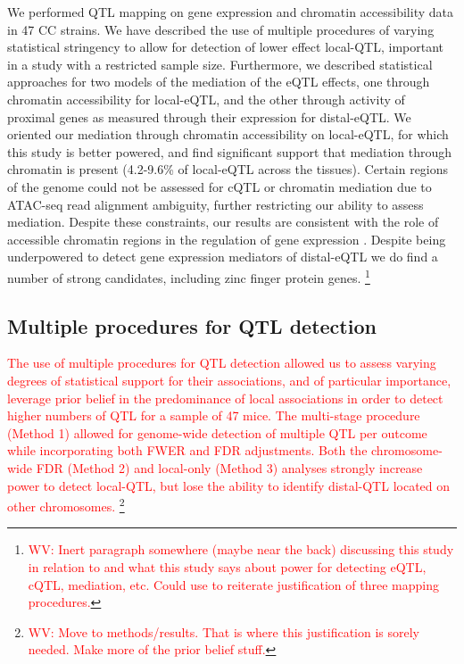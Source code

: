 \documentclass[9pt,twocolumn,twoside]{gsajnl}
\newcommand{\WV}[2]{\textcolor{red}{#1\footnote{\textcolor{red}{WV: #2}}}}
\begin{document}
We performed QTL mapping on gene expression and chromatin accessibility data in 47 CC strains. We have described the use of multiple procedures of varying statistical stringency to allow for detection of lower effect local-QTL, important in a study with a restricted sample size. 
Furthermore, we described statistical approaches for two models of the mediation of the eQTL effects, one through chromatin accessibility for local-eQTL, and the other through activity of proximal genes as measured through their expression for distal-eQTL. We oriented our mediation through chromatin accessibility on local-eQTL, for which this study is better powered, and find significant support that mediation through chromatin is present (4.2-9.6\% of local-eQTL across the tissues). Certain regions of the genome could not be assessed for cQTL or chromatin mediation due to ATAC-seq read alignment ambiguity, further restricting our ability to assess mediation. Despite these constraints, our results are consistent with the role of accessible chromatin regions in the regulation of gene expression \citep{Klemm2019}. Despite being underpowered to detect gene expression mediators of distal-eQTL we do find a number of strong candidates, including zinc finger protein genes.
\WV{}{Inert paragraph somewhere (maybe near the back) discussing this study in relation to \citet{KeeleSPARCC} and what this study says about power for detecting eQTL, cQTL, mediation, etc. Could use to reiterate justification of three mapping procedures.}

\subsection{Multiple procedures for QTL detection}

\WV{The use of multiple procedures for QTL detection allowed us to assess varying degrees of statistical support for their associations, and of particular importance, leverage prior belief in the predominance of local associations in order to detect higher numbers of QTL for a sample of 47 mice. The multi-stage procedure (Method 1) allowed for genome-wide detection of multiple QTL per outcome while incorporating both FWER and FDR adjustments. Both the chromosome-wide FDR (Method 2) and local-only (Method 3) analyses strongly increase power to detect local-QTL, but lose the ability to identify distal-QTL located on other chromosomes.
}{Move to methods/results. That is where this justification is sorely needed. Make more of the prior belief stuff.}
\end{document}
